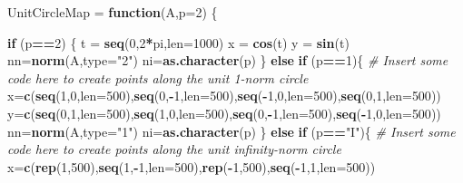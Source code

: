 \documentclass[]{article}
\newenvironment{Shaded}{\begin{snugshade}}{\end{snugshade}}
\newcommand{\CommentTok}[1]{\textcolor[rgb]{0.56,0.35,0.01}{\textit{#1}}}
\newcommand{\ControlFlowTok}[1]{\textcolor[rgb]{0.13,0.29,0.53}{\textbf{#1}}}
\newcommand{\DataTypeTok}[1]{\textcolor[rgb]{0.13,0.29,0.53}{#1}}
\newcommand{\DecValTok}[1]{\textcolor[rgb]{0.00,0.00,0.81}{#1}}
\newcommand{\KeywordTok}[1]{\textcolor[rgb]{0.13,0.29,0.53}{\textbf{#1}}}
\newcommand{\NormalTok}[1]{#1}
\newcommand{\OperatorTok}[1]{\textcolor[rgb]{0.81,0.36,0.00}{\textbf{#1}}}
\newcommand{\StringTok}[1]{\textcolor[rgb]{0.31,0.60,0.02}{#1}}
\begin{document}
\begin{Shaded}
\begin{Highlighting}[]
\NormalTok{UnitCircleMap =}\StringTok{ }\ControlFlowTok{function}\NormalTok{(A,}\DataTypeTok{p=}\DecValTok{2}\NormalTok{) \{}
  
  \ControlFlowTok{if}\NormalTok{ (p}\OperatorTok{==}\DecValTok{2}\NormalTok{) \{}
\NormalTok{    t =}\StringTok{ }\KeywordTok{seq}\NormalTok{(}\DecValTok{0}\NormalTok{,}\DecValTok{2}\OperatorTok{*}\NormalTok{pi,}\DataTypeTok{len=}\DecValTok{1000}\NormalTok{)}
\NormalTok{    x =}\StringTok{ }\KeywordTok{cos}\NormalTok{(t)}
\NormalTok{    y =}\StringTok{ }\KeywordTok{sin}\NormalTok{(t)}
\NormalTok{    nn=}\KeywordTok{norm}\NormalTok{(A,}\DataTypeTok{type=}\StringTok{"2"}\NormalTok{)}
\NormalTok{    ni=}\KeywordTok{as.character}\NormalTok{(p)}
\NormalTok{  \}}
  \ControlFlowTok{else} \ControlFlowTok{if}\NormalTok{ (p}\OperatorTok{==}\DecValTok{1}\NormalTok{)\{}
    \CommentTok{# Insert some code here to create points along the unit 1-norm circle}
\NormalTok{    x=}\KeywordTok{c}\NormalTok{(}\KeywordTok{seq}\NormalTok{(}\DecValTok{1}\NormalTok{,}\DecValTok{0}\NormalTok{,}\DataTypeTok{len=}\DecValTok{500}\NormalTok{),}\KeywordTok{seq}\NormalTok{(}\DecValTok{0}\NormalTok{,}\OperatorTok{-}\DecValTok{1}\NormalTok{,}\DataTypeTok{len=}\DecValTok{500}\NormalTok{),}\KeywordTok{seq}\NormalTok{(}\OperatorTok{-}\DecValTok{1}\NormalTok{,}\DecValTok{0}\NormalTok{,}\DataTypeTok{len=}\DecValTok{500}\NormalTok{),}\KeywordTok{seq}\NormalTok{(}\DecValTok{0}\NormalTok{,}\DecValTok{1}\NormalTok{,}\DataTypeTok{len=}\DecValTok{500}\NormalTok{))}
\NormalTok{    y=}\KeywordTok{c}\NormalTok{(}\KeywordTok{seq}\NormalTok{(}\DecValTok{0}\NormalTok{,}\DecValTok{1}\NormalTok{,}\DataTypeTok{len=}\DecValTok{500}\NormalTok{),}\KeywordTok{seq}\NormalTok{(}\DecValTok{1}\NormalTok{,}\DecValTok{0}\NormalTok{,}\DataTypeTok{len=}\DecValTok{500}\NormalTok{),}\KeywordTok{seq}\NormalTok{(}\DecValTok{0}\NormalTok{,}\OperatorTok{-}\DecValTok{1}\NormalTok{,}\DataTypeTok{len=}\DecValTok{500}\NormalTok{),}\KeywordTok{seq}\NormalTok{(}\OperatorTok{-}\DecValTok{1}\NormalTok{,}\DecValTok{0}\NormalTok{,}\DataTypeTok{len=}\DecValTok{500}\NormalTok{))}
\NormalTok{    nn=}\KeywordTok{norm}\NormalTok{(A,}\DataTypeTok{type=}\StringTok{"1"}\NormalTok{)}
\NormalTok{    ni=}\KeywordTok{as.character}\NormalTok{(p)}
\NormalTok{  \}}
  \ControlFlowTok{else} \ControlFlowTok{if}\NormalTok{ (p}\OperatorTok{==}\StringTok{"I"}\NormalTok{)\{}
    \CommentTok{# Insert some code here to create points along the unit infinity-norm circle}
\NormalTok{    x=}\KeywordTok{c}\NormalTok{(}\KeywordTok{rep}\NormalTok{(}\DecValTok{1}\NormalTok{,}\DecValTok{500}\NormalTok{),}\KeywordTok{seq}\NormalTok{(}\DecValTok{1}\NormalTok{,}\OperatorTok{-}\DecValTok{1}\NormalTok{,}\DataTypeTok{len=}\DecValTok{500}\NormalTok{),}\KeywordTok{rep}\NormalTok{(}\OperatorTok{-}\DecValTok{1}\NormalTok{,}\DecValTok{500}\NormalTok{),}\KeywordTok{seq}\NormalTok{(}\OperatorTok{-}\DecValTok{1}\NormalTok{,}\DecValTok{1}\NormalTok{,}\DataTypeTok{len=}\DecValTok{500}\NormalTok{))}

\end{Highlighting}
\end{Shaded}
\end{document}
